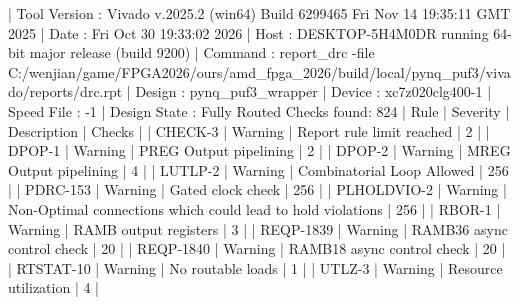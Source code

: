 \begin{codeblock}
| Tool Version : Vivado v.2025.2 (win64) Build 6299465 Fri Nov 14 19:35:11 GMT 2025
| Date         : Fri Oct 30 19:33:02 2026
| Host         : DESKTOP-5H4M0DR running 64-bit major release  (build 9200)
| Command      : report_drc -file C:/wenjian/game/FPGA2026/ours/amd_fpga_2026/build/local/pynq_puf3/vivado/reports/drc.rpt
| Design       : pynq_puf3_wrapper
| Device       : xc7z020clg400-1
| Speed File   : -1
| Design State : Fully Routed
             Checks found: 824
| Rule        | Severity | Description                                                 | Checks |
| CHECK-3     | Warning  | Report rule limit reached                                   | 2      |
| DPOP-1      | Warning  | PREG Output pipelining                                      | 2      |
| DPOP-2      | Warning  | MREG Output pipelining                                      | 4      |
| LUTLP-2     | Warning  | Combinatorial Loop Allowed                                  | 256    |
| PDRC-153    | Warning  | Gated clock check                                           | 256    |
| PLHOLDVIO-2 | Warning  | Non-Optimal connections which could lead to hold violations | 256    |
| RBOR-1      | Warning  | RAMB output registers                                       | 3      |
| REQP-1839   | Warning  | RAMB36 async control check                                  | 20     |
| REQP-1840   | Warning  | RAMB18 async control check                                  | 20     |
| RTSTAT-10   | Warning  | No routable loads                                           | 1      |
| UTLZ-3      | Warning  | Resource utilization                                        | 4      |
\end{codeblock}
